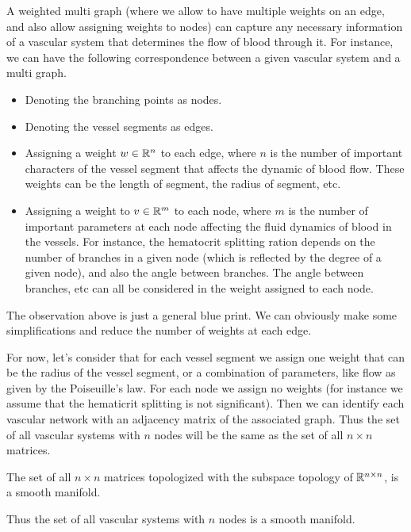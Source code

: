 \begin{observation}
	A weighted multi graph (where we allow to have multiple weights on an edge, and also allow assigning weights to nodes) can capture any necessary information of a vascular system that determines the flow of blood through it. For instance, we can have the following correspondence between a given vascular system and  a multi graph.
	\begin{itemize}[noitemsep]
		\item Denoting the branching points as nodes.
		\item Denoting the vessel segments as edges.
		\item Assigning a weight $ w\in \mathbb{R}^n $ to each edge, where $ n $ is the number of important characters of the vessel segment that affects the dynamic of blood flow. These weights can be the length of segment, the radius of segment, etc.
		\item Assigning a weight to $ v \in \mathbb{R}^m $ to each node, where $ m $ is the number of important parameters at each node affecting the fluid dynamics of blood in the vessels. For instance, the hematocrit splitting ration depends on the number of branches in a given node (which is reflected by the degree of a given node), and also the angle between branches. The angle between branches, etc can all be considered in the weight assigned to each node.
	\end{itemize}
\end{observation}

The observation above is just a general blue print. We can obviously make some simplifications and reduce the number of weights at each edge.

\begin{observation}
	For now, let's consider that for each vessel segment we assign one weight that can be the radius of the vessel segment, or a combination of parameters, like flow as given by the Poiseuille's law. For each node we assign no weights (for instance we assume that the hematicrit splitting is not significant). Then we can identify each vascular network with an adjacency matrix of the associated graph.  Thus the set of all vascular systems with $ n $ nodes will be the same as the set of all $ n\times n $ matrices. 
	\begin{proposition}
		The set of all $ n\times n $ matrices topologized with the subspace topology of $ \mathbb{R}^{n\times n} $, is a smooth manifold.
	\end{proposition}
	Thus the set of all vascular systems with $ n $ nodes is a smooth manifold.
\end{observation} 

